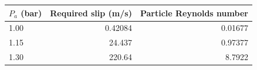 \begin{tabular}{lrr}\toprule
$P_a$ (bar) & Required slip (m/s) & Particle Reynolds number \\ \midrule
1.00 & 0.42084 & 0.01677 \\
1.15 & 24.437 & 0.97377 \\
1.30 & 220.64 & 8.7922 \\
\bottomrule\end{tabular}
